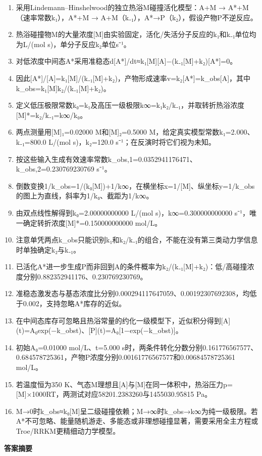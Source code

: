 \documentclass[UTF8,11pt,a4paper]{ctexart}
\begin{document}
\begin{enumerate}
\item 采用Lindemann–Hinshelwood的独立热浴M碰撞活化模型：A+M → A*+M（速率常数k₁），A*+M → A+M（k₋₁），A*→P（k₂），假设产物P不逆反应。
\item 热浴碰撞物M的大量浓度[M]由实验固定，活化/失活分子反应的k₁和k₋₁单位均为L/(mol s)，单分子反应k₂单位s⁻¹。
\item 对低浓度中间态A*采用准稳态d[A*]/dt≈k₁[M][A]−(k₋₁[M]+k₂)[A*]=0。
\item 因此[A*]/[A]=k₁[M]/(k₋₁[M]+k₂)，产物形成速率v=k₂[A*]=k\_obs[A]，其中k\_obs=k₁[M]k₂/(k₋₁[M]+k₂)。
\item 定义低压极限常数k₀=k₁及高压一级极限k∞=k₁k₂/k₋₁，并取转折热浴浓度[M]*=k₂/k₋₁=k∞/k₀。
\item 两点测量用[M]₁=0.02000 M和[M]₂=0.5000 M，给定真实模型常数k₁=2.000、k₋₁=800.0 L/(mol s)，k₂=120.0 s⁻¹；在反演时将它们视为未知。
\item 按这些输入生成有效速率常数k\_obs,1=0.0352941176471、k\_obs,2=0.230769230769 s⁻¹。
\item 倒数变换1/k\_obs=1/(k₀[M])+1/k∞，在横坐标x=1/[M]、纵坐标y=1/k\_obs的图上为直线，斜率为1/k₀、截距为1/k∞。
\item 由双点线性解得到k₀=2.00000000000 L/(mol s)，k∞=0.300000000000 s⁻¹，唯一确定转折浓度[M]*=0.150000000000 mol/L。
\item 注意单凭两点k\_obs只能识别k₁和k₂/k₋₁的组合，不能在没有第三类动力学信息时单独确定k₂与k₋₁。
\item 已活化A*进一步生成P而非回到A的条件概率为k₂/(k₋₁[M]+k₂)：低/高碰撞浓度分别0.882352941176、0.230769230769。
\item 准稳态激发态与基态浓度比分别0.000294117647059、0.00192307692308，均低于0.002，支持忽略A*库存的近似。
\item 在中间态库存可忽略且热浴常量的约化一级模型下，近似积分得到[A](t)=A₀exp(−k\_obst)、[P](t)=A₀[1−exp(−k\_obst)]。
\item 初始A₀=0.01000 mol/L、t=5.000 s时，两条件转化分数分别0.161776567577、0.684578725361，产物P浓度分别0.00161776567577和0.00684578725361 mol/L。
\item 若温度恒为350 K、气态M理想且[A]与[M]在同一体积中，热浴压力p=[M]×1000RT，两测试对应58201.2383260与1455030.95815 Pa。
\item M→0时k\_obs≈k₀[M]呈二级碰撞依赖；M→∞时k\_obs→k∞为纯一级极限。若A*不可忽略、能量随机游走、多能态或非理想碰撞显著，需要采用全主方程或Troe/RRKM更精细动力学模型。
\end{enumerate}
\noindent\textbf{答案摘要}\par
\end{document}
